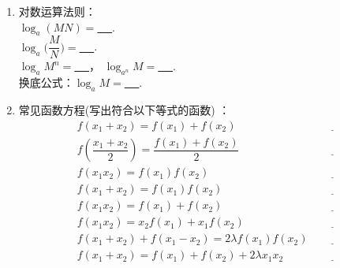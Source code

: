 \documentclass{article}
\newif\ifte
\newcommand{\q}{\quad}
\begin{document}
\begin{multicols}{2}
\begin{enumerate}[leftmargin=20pt]
\item 对数运算法则：\\ $ \log_a (MN)= $\underline{\ \ifte 
    $ \log_a M+\log_a N $ \else \hspace{2cm} \fi\ }. \\
$ \log_a \Big(\dfrac{M}{N}\Big)= $\underline{\ \ifte 
    $ \log_a M-\log_a N $ \else \hspace{2cm} \fi\ }. \\
$ \log_a M^n= $\underline{\ \ifte 
    $ n\log_a M $ \else \hspace{1.5cm} \fi\ }，\q 
$ \log_{a^n} M= $\underline{\ \ifte 
    $ \dfrac{1}{n}\log_a M $ \else \hspace{1.5cm} \fi\ }. \\
换底公式：$ \log_a M= $\underline{\ \ifte 
    $ \dfrac{\log_b M}{\log_b a} $ \else \hspace{2cm} \fi\ }.

\item 常见函数方程\ifte \else (写出符合以下等式的函数) \fi：
\begin{align*}
&f(x_1+x_2)=f(x_1)+f(x_2)   	
    &\underline{\ \ifte kx\else \hspace{1cm} \fi\ } \\
&f\left(\dfrac{x_1+x_2}{2}\right) =\dfrac{f(x_1)+f(x_2)}{2}  
    &\underline{\ \ifte kx+b\else \hspace{1cm} \fi\ }\\
&f(x_1x_2)=f(x_1)f(x_2)   	
    & \underline{\ \ifte x^{\alpha}\else \hspace{1cm} \fi\ }\\
&f(x_1+x_2)=f(x_1)f(x_2)   	
    &\underline{\ \ifte a^x\else \hspace{1cm} \fi\ }\\
&f(x_1x_2)=f(x_1)+f(x_2)   	
    &\underline{\ \ifte \log_{a}x\else \hspace{1cm} \fi\ } \\
&f(x_1x_2)=x_2f(x_1)+x_1f(x_2)   	
    &\underline{\ \ifte x\log_{a}x\else \hspace{1cm} \fi\ } \\
& f(x_1+x_2)+f(x_1-x_2)=2\lambda f(x_1)f(x_2)
    &\underline{\ \ifte \dfrac{1}{\lambda}\cos x \else \hspace{1cm} \fi\ } \\
& f(x_1+x_2)= f(x_1)+f(x_2)+2\lambda x_1x_2
    &\underline{\ \ifte \lambda x^2+\mu x \else \hspace{1cm} \fi\ } 
\end{align*}


\end{enumerate}
\end{multicols}
\end{document}
